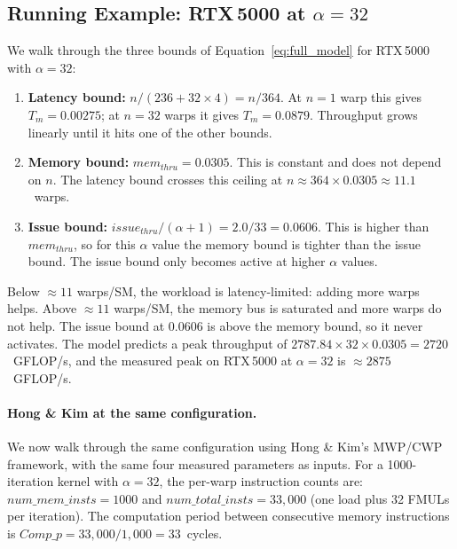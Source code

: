 \subsection{Running Example: RTX\,5000 at $\alpha = 32$}
\label{subsec:running_example}

We walk through the three bounds of Equation~\ref{eq:full_model} for
RTX\,5000 with $\alpha = 32$:

\begin{enumerate}
  \item \textbf{Latency bound:}
    $n / (236 + 32 \times 4) = n / 364$.
    At $n = 1$ warp this gives $T_m = 0.00275$;
    at $n = 32$ warps it gives $T_m = 0.0879$.
    Throughput grows linearly until it hits one of the other bounds.

  \item \textbf{Memory bound:}
    $mem_{thru} = 0.0305$.
    This is constant and does not depend on $n$.
    The latency bound crosses this ceiling at $n \approx 364 \times 0.0305 \approx 11.1$~warps.

  \item \textbf{Issue bound:}
    $issue_{thru} / (\alpha + 1) = 2.0 / 33 = 0.0606$.
    This is higher than $mem_{thru}$, so for this $\alpha$ value the
    memory bound is tighter than the issue bound.
    The issue bound only becomes active at higher $\alpha$ values.
\end{enumerate}

Below $\approx 11$ warps/SM, the workload is latency-limited: adding more warps
helps.
Above $\approx 11$ warps/SM, the memory bus is saturated and more warps do not
help.
The issue bound at 0.0606 is above the memory bound, so it never activates.
The model predicts a peak throughput of
$2787.84 \times 32 \times 0.0305 = 2720$~GFLOP/s,
and the measured peak on RTX\,5000 at $\alpha = 32$ is $\approx 2875$~GFLOP/s.

\paragraph{Hong \& Kim at the same configuration.}
We now walk through the same configuration using Hong \& Kim's MWP/CWP
framework, with the same four measured parameters as inputs.
For a 1000-iteration kernel with $\alpha = 32$, the per-warp instruction
counts are: $\mathit{num\_mem\_insts} = 1000$ and
$\mathit{num\_total\_insts} = 33{,}000$ (one load plus 32 FMULs per iteration).
The computation period between consecutive memory instructions is
$\mathit{Comp\_p} = 33{,}000 / 1{,}000 = 33$~cycles.

